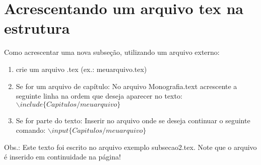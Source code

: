 \section{Acrescentando um arquivo tex na estrutura}

Como acrescentar uma nova subseção, utilizando um arquivo externo:

\begin{enumerate}
    \item crie um arquivo .tex (ex.: meuarquivo.tex)
    \item Se for um arquivo de capítulo:
        \subitem No arquivo Monografia.text acrescente a seguinte linha na ordem que deseja aparecer no texto: $\backslash include\{Capitulos/meuarquivo\}$
    \item Se for parte do texto:
        \subitem Inserir no arquivo onde se deseja continuar o seguinte comando:
            \subsubitem $\backslash input\{Capitulos/meuarquivo\}$
    
    
\end{enumerate}


{\color{blue}

Obs.: Este texto foi escrito no arquivo exemplo subsecao2.tex. 
Note que o arquivo é inserido em continuidade na página!

}

